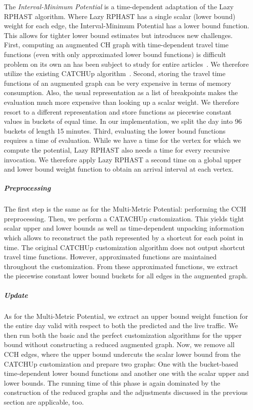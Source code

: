 \documentclass[a4paper,UKenglish,cleveref, autoref, thm-restate]{lipics-v2021}
\begin{document}
The \emph{Interval-Minimum Potential} is a time-dependent adaptation of the Lazy RPHAST algorithm.
Where Lazy RPHAST has a single scalar (lower bound) weight for each edge, the Interval-Minimum Potential has a lower bound function.
This allows for tighter lower bound estimates but introduces new challenges.
First, computing an augmented CH graph with time-dependent travel time functions (even with only approximated lower bound functions) is difficult problem on its own an has been subject to study for entire articles~\cite{bgsv-mtdtt-13,swz-sfert-21}.
We therefore utilize the existing CATCHUp algorithm~\cite{swz-sfert-21}.
Second, storing the travel time functions of an augmented graph can be very expensive in terms of memory consumption.
Also, the usual representation as a list of breakpoints makes the evaluation much more expensive than looking up a scalar weight.
We therefore resort to a different representation and store functions as piecewise constant values in buckets of equal time.
In our implementation, we split the day into 96 buckets of length 15 minutes.
Third, evaluating the lower bound functions requires a time of evaluation.
While we have a time for the vertex for which we compute the potential, Lazy RPHAST also needs a time for every recursive invocation.
We therefore apply Lazy RPHAST a second time on a global upper and lower bound weight function to obtain an arrival interval at each vertex.

\subparagraph{Preprocessing}
The first step is the same as for the Multi-Metric Potential: performing the CCH preprocessing.
Then, we perform a CATACHUp customization.
This yields tight scalar upper and lower bounds as well as time-dependent unpacking information which allows to reconstruct the path represented by a shortcut for each point in time.
The original CATCHUp customization algorithm does not output shortcut travel time functions.
However, approximated functions are maintained throughout the customization.
From these approximated functions, we extract the piecewise constant lower bound buckets for all edges in the augmented graph.

\subparagraph{Update}
As for the Multi-Metric Potential, we extract an upper bound weight function for the entire day valid with respect to both the predicted and the live traffic.
We then run both the basic and the perfect customization algorithms for the upper bound without constructing a reduced augmented graph.
Now, we remove all CCH edges, where the upper bound undercuts the scalar lower bound from the CATCHUp customization and prepare two graphs:
One with the bucket-based time-dependent lower bound functions and another one with the scalar upper and lower bounds.
The running time of this phase is again dominated by the construction of the reduced graphs and the adjustments discussed in the previous section are applicable, too.
\end{document}
